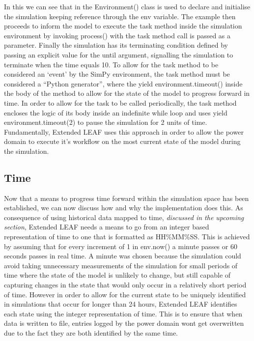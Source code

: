 \documentclass{l4proj}
\begin{document}
In this we can see that in the Environment() class is used to declare and initialise the simulation keeping reference through the env variable.
The example then proceeds to inform the model to execute the task method inside the simulation environment by invoking process() with the task method call is passed as a parameter.
Finally the simulation has its terminating condition defined by passing an explicit value for the until argument, signalling the simulation to terminate when the time equals 10.
To allow for the task method to be considered an `event' by the SimPy environment, the task method must be considered a ``Python generator'', where the yield environment.timeout() inside the body of the method to allow for the state of the model to progress forward in time.
In order to allow for the task to be called periodically, the task method encloses the logic of its body inside an indefinite while loop and uses yield environment.timeout(2) to pause the simulation for 2 units of time.
Fundamentally, Extended LEAF uses this approach in order to allow the power domain to execute it's workflow on the most current state of the model during the simulation.

\subsection{Time}\label{imp:subsec:time}
Now that a means to progress time forward within the simulation space has been established, we can now discuss how and why the implementation does this.
As consequence of using historical data mapped to time, \textit{discussed in the upcoming section}, Extended LEAF needs a means to go from an integer based representation of time to one that is formatted as HH\%MM\%SS.
This is achieved by assuming that for every increment of 1 in env.now() a minute passes or 60 seconds passes in real time.
A minute was chosen because the simulation could avoid taking unnecessary measurements of the simulation for small periods of time where the state of the model is unlikely to change, but still capable of capturing changes in the state that would only occur in a relatively short period of time.
However in order to allow for the current state to be uniquely identified in simulations that occur for longer than 24 hours, Extended LEAF identifies each state using the integer representation of time.
This is to ensure that when data is written to file, entries logged by the power domain wont get overwritten due to the fact they are both identified by the same time.
\end{document}

